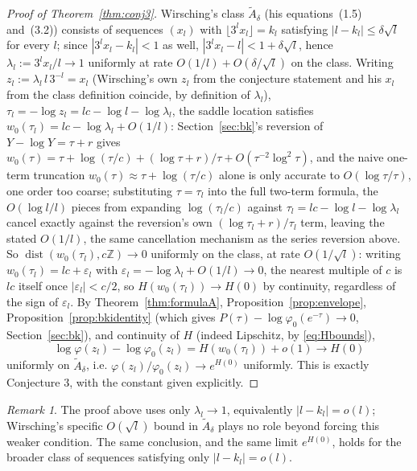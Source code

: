 \documentclass[11pt]{amsart}
\theoremstyle{plain}
\theoremstyle{definition}
\theoremstyle{remark}
\newtheorem{remark}[theorem]{Remark}
\newcommand{\Z}{\mathbb{Z}}
\begin{document}
\begin{proof}[Proof of Theorem~\ref{thm:conj3}]
Wirsching's class $\widetilde{A}_\delta$ (his equations~(1.5) and~(3.2)) consists of sequences
$(x_l)$ with $\lfloor 3^l x_l\rfloor = k_l$ satisfying $|l-k_l|\le\delta\sqrt l$ for every $l$; since
$|3^lx_l-k_l|<1$ as well, $|3^lx_l-l|<1+\delta\sqrt l$, hence $\lambda_l := 3^lx_l/l \to 1$
uniformly at rate $O(1/l)+O(\delta/\sqrt l)$ on the class. Writing $z_l :=
\lambda_l\, l\, 3^{-l} = x_l$ (Wirsching's own $z_l$ from the conjecture statement and his $x_l$
from the class definition coincide, by definition of $\lambda_l$), $\tau_l = -\log z_l = lc - \log
l - \log\lambda_l$, the saddle location
satisfies $w_0(\tau_l) = lc - \log\lambda_l + O(1/l)$: Section~\ref{sec:bk}'s reversion of
$Y-\log Y=\tau+r$ gives $w_0(\tau) = \tau+\log(\tau/c)+(\log\tau+r)/\tau+O(\tau^{-2}\log^2\tau)$,
and the naive one-term truncation $w_0(\tau)\approx\tau+\log(\tau/c)$ alone is only accurate to
$O(\log\tau/\tau)$, one order too coarse; substituting $\tau=\tau_l$ into the full two-term formula,
the $O(\log l/l)$ pieces from expanding $\log(\tau_l/c)$ against $\tau_l = lc-\log l-\log\lambda_l$
cancel exactly against the reversion's own $(\log\tau_l+r)/\tau_l$ term, leaving the stated $O(1/l)$,
the same cancellation mechanism as the series reversion above. So
$\operatorname{dist}(w_0(\tau_l), c\Z) \to 0$ uniformly on the class, at rate
$O(1/\sqrt l)$: writing $w_0(\tau_l) = lc + \varepsilon_l$ with $\varepsilon_l = -\log\lambda_l +
O(1/l) \to 0$, the nearest multiple of $c$ is $lc$ itself once $|\varepsilon_l|<c/2$, so $H(w_0(\tau_l))
\to H(0)$ by continuity, regardless of the sign of $\varepsilon_l$. By
Theorem~\ref{thm:formulaA}, Proposition~\ref{prop:envelope}, Proposition~\ref{prop:bkidentity}
(which gives $P(\tau)-\log\varphi_0(e^{-\tau})\to0$, Section~\ref{sec:bk}), and continuity of $H$
(indeed Lipschitz, by \eqref{eq:Hbounds}),
\[
\log\varphi(z_l) - \log\varphi_0(z_l) = H(w_0(\tau_l)) + o(1) \to H(0)
\]
uniformly on $\widetilde{A}_\delta$, i.e. $\varphi(z_l)/\varphi_0(z_l) \to e^{H(0)}$ uniformly. This
is exactly Conjecture 3, with the constant given explicitly.
\end{proof}

\begin{remark}
The proof above uses only $\lambda_l\to1$, equivalently $|l-k_l|=o(l)$; Wirsching's specific
$O(\sqrt l)$ bound in $\widetilde{A}_\delta$ plays no role beyond forcing this weaker condition. The
same conclusion, and the same limit $e^{H(0)}$, holds for the broader class of sequences satisfying
only $|l-k_l|=o(l)$.
\end{remark}
\end{document}
